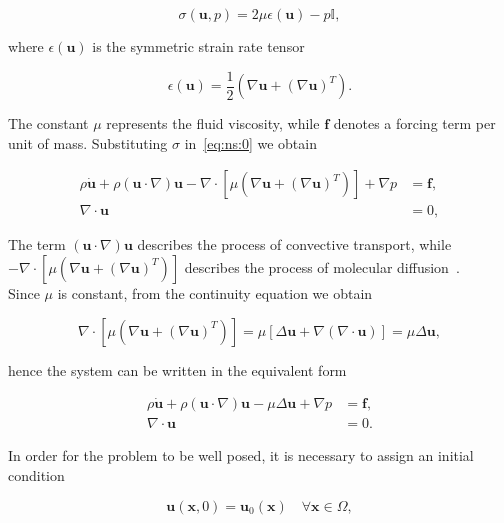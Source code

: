 \documentclass[11pt,a4paper,titlepage]{report}
\begin{document}
\begin{equation}
\sigma(\mathbf{u}, p) = 2 \mu \epsilon(\mathbf{u}) - p \mathbb{I},
\end{equation}

where $\epsilon(\mathbf{u})$ is the symmetric strain rate tensor

\begin{equation}
\epsilon(\mathbf{u}) = \frac{1}{2} (\nabla \mathbf{u} + (\nabla \mathbf{u})^T).
\end{equation}

The constant $\mu$ represents the fluid viscosity, while $\mathbf{f}$ denotes a forcing term per unit of mass. Substituting $\sigma$ in~\eqref{eq:ns:0} we obtain

\begin{align}
\rho \dot{\mathbf{u}} + \rho ( \mathbf{u} \cdot \nabla) \mathbf{u} - \nabla \cdot [ \mu (\nabla \mathbf{u} + (\nabla  \mathbf{u})^T)] +  \nabla p &= \mathbf{f},  \\
\nabla \cdot \mathbf{u} &= 0,
\end{align}

The term $(\mathbf{u} \cdot \nabla)\mathbf{u}$ describes the process of convective transport, while $- \nabla \cdot [ \mu (\nabla \mathbf{u} + (\nabla  \mathbf{u})^T)] $ describes the process of molecular diffusion~\cite{}.\\
Since $\mu$ is constant, from the continuity equation we obtain

\begin{equation}
\nabla \cdot [ \mu (\nabla \mathbf{u} + (\nabla  \mathbf{u})^T)] = \mu [\Delta \mathbf{u} + \nabla(\nabla \cdot \mathbf{u})] = \mu \Delta \mathbf{u},
\end{equation}

hence the system can be written in the equivalent form

\begin{align}
\rho \dot{\mathbf{u}} + \rho ( \mathbf{u} \cdot \nabla) \mathbf{u} - \mu \Delta \mathbf{u} +  \nabla p &= \mathbf{f}, \\
\nabla \cdot \mathbf{u} &= 0.
\end{align}

In order for the problem to be well posed, it is necessary to assign an initial condition

\begin{equation}
\mathbf{u} (\mathbf{x}, 0) = \mathbf{u}_0(\mathbf{x}) \quad \forall \mathbf{x} \in \Omega,
\end{equation}
\end{document}
